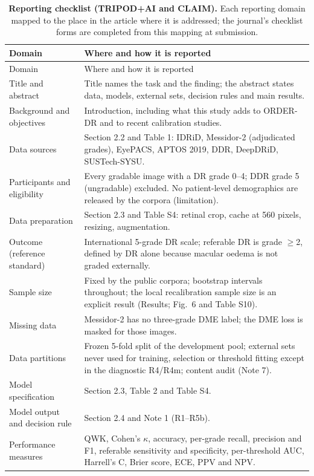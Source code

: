 \documentclass[11pt]{article}
\begin{document}
\begingroup\small
\begin{longtable}{@{}p{4.0cm}p{11.8cm}@{}}
\caption{\textbf{Reporting checklist (TRIPOD+AI and CLAIM).} Each reporting domain mapped to the
place in the article where it is addressed; the journal's checklist forms are completed from this
mapping at submission.}\label{tab:checklist}\\
\toprule
Domain & Where and how it is reported \\
\midrule\endfirsthead
\toprule
Domain & Where and how it is reported \\
\midrule\endhead
Title and abstract & Title names the task and the finding; the abstract states data, models,
external sets, decision rules and main results. \\
Background and objectives & Introduction, including what this study adds to ORDER-DR and to
recent calibration studies. \\
Data sources & Section 2.2 and Table 1: IDRiD, Messidor-2 (adjudicated grades), EyePACS, APTOS
2019, DDR, DeepDRiD, SUSTech-SYSU. \\
Participants and eligibility & Every gradable image with a DR grade 0--4; DDR grade 5 (ungradable)
excluded. No patient-level demographics are released by the corpora (limitation). \\
Data preparation & Section 2.3 and Table S4: retinal crop, cache at 560 pixels, resizing,
augmentation. \\
Outcome (reference standard) & International 5-grade DR scale; referable DR is grade $\geq$2,
defined by DR alone because macular oedema is not graded externally. \\
Sample size & Fixed by the public corpora; bootstrap intervals throughout; the local recalibration
sample size is an explicit result (Results; Fig.~6 and Table S10). \\
Missing data & Messidor-2 has no three-grade DME label; the DME loss is masked for those images. \\
Data partitions & Frozen 5-fold split of the development pool; external sets never used for training,
selection or threshold fitting except in the diagnostic R4/R4m; content audit (Note 7). \\
Model specification & Section 2.3, Table 2 and Table S4. \\
Model output and decision rule & Section 2.4 and Note 1 (R1--R5b). \\
Performance measures & QWK, Cohen's $\kappa$, accuracy, per-grade recall, precision and F1,
referable sensitivity and specificity, per-threshold AUC, Harrell's C, Brier score, ECE, PPV and NPV. \\

\end{longtable}
\end{document}
